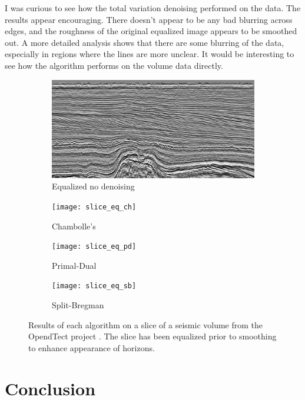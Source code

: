 \documentclass[11pt]{article}
\begin{document}
I was curious to see how the total variation denoising performed on the data.
The results appear encouraging. 
There doesn't appear to be any bad blurring across edges, and the roughness of the original equalized image appears to be smoothed out.
A more detailed analysis shows that there are some blurring of the data, especially in regions where the lines are more unclear.
It would be interesting to see how the algorithm performs on the volume data directly.


\begin{figure}
\centering
\graphicspath{{images/}}
\begin{subfigure}[b]{0.5\textwidth}
\centering
\includegraphics[width=\textwidth]{slice_eq}
\caption{Equalized no denoising}
\label{slice:noise}
\end{subfigure}
\begin{subfigure}[b]{0.5\textwidth}
\centering
\texttt{[image: slice\_eq\_ch]}
\caption{Chambolle's}
\label{slice:ch}
\end{subfigure}
\begin{subfigure}[b]{0.5\textwidth}
\centering
\texttt{[image: slice\_eq\_pd]}
\caption{Primal-Dual}
\label{slice:pd}
\end{subfigure}
\begin{subfigure}[b]{0.5\textwidth}
\centering
\texttt{[image: slice\_eq\_sb]}
\caption{Split-Bregman}
\label{slice:sb}
\end{subfigure}
\caption{Results of each algorithm on a slice of a seismic volume from the OpendTect project \cite{opendTectWeb}. The slice has been equalized prior to smoothing to enhance appearance of horizons.}
\label{fig:slice:dn}
\end{figure}


\section{Conclusion}
\end{document}
